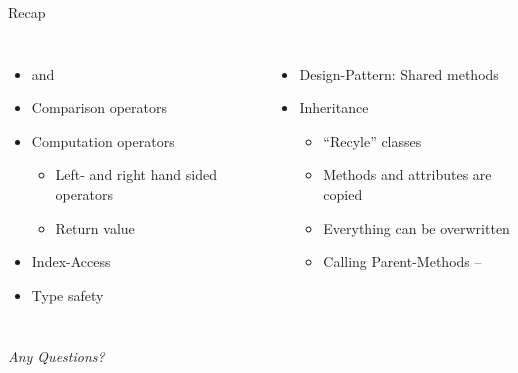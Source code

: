 \begin{frame}[fragile]{Recap}
%
\begin{columns}[T]
\begin{itemize}
\item {} and 
\item Comparison operators
\item Computation operators
	\begin{itemize}
	\item Left- and right hand sided operators
	\item Return value 
	\end{itemize}
\item Index-Access
\item Type safety
\end{itemize}
%
\begin{itemize}
\item Design-Pattern: Shared methods
\item Inheritance
	\begin{itemize}
	\item \enquote{Recyle} classes
	\item Methods and attributes are copied
	\item Everything can be overwritten
	\item Calling Parent-Methods -- 
	\end{itemize}
\end{itemize}

\end{columns}
%
\begin{center}
	\emph{Any Questions?}
\end{center}
%
\end{frame}


